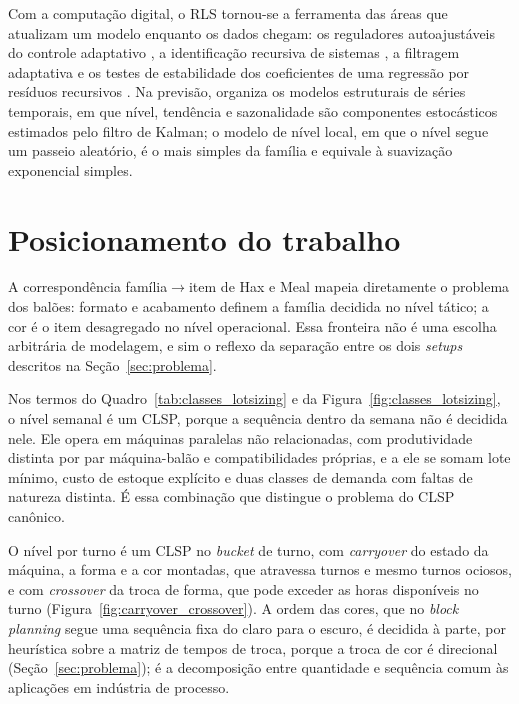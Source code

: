 \documentclass[
    12pt,
    openright,
    oneside,
    a4paper,
    fleqn,
    chapter=TITLE,
    section=TITLE,
    english,
    brazil
]{abntex2}
\begin{document}
Com a computação digital, o RLS tornou-se a ferramenta das áreas que atualizam um modelo enquanto os dados chegam: os reguladores autoajustáveis do controle adaptativo \cite{astromwittenmark1973}, a identificação recursiva de sistemas \cite{ljungsoderstrom1983}, a filtragem adaptativa \cite{haykin2014} e os testes de estabilidade dos coeficientes de uma regressão por resíduos recursivos \cite{brown1975}. Na previsão,  organiza os modelos estruturais de séries temporais, em que nível, tendência e sazonalidade são componentes estocásticos estimados pelo filtro de Kalman; o modelo de nível local, em que o nível segue um passeio aleatório, é o mais simples da família e equivale à suavização exponencial simples.

\section{Posicionamento do trabalho}
\label{sec:posicionamento}

A correspondência família$\to$item de Hax e Meal mapeia diretamente o problema dos balões: formato e acabamento definem a família decidida no nível tático; a cor é o item desagregado no nível operacional. Essa fronteira não é uma escolha arbitrária de modelagem, e sim o reflexo da separação entre os dois \textit{setups} descritos na Seção~\ref{sec:problema}.

Nos termos do Quadro~\ref{tab:classes_lotsizing} e da Figura~\ref{fig:classes_lotsizing}, o nível semanal é um CLSP, porque a sequência dentro da semana não é decidida nele. Ele opera em máquinas paralelas não relacionadas, com produtividade distinta por par máquina-balão e compatibilidades próprias, e a ele se somam lote mínimo, custo de estoque explícito e duas classes de demanda com faltas de natureza distinta. É essa combinação que distingue o problema do CLSP canônico.

O nível por turno é um CLSP no \textit{bucket} de turno, com \textit{carryover} do estado da máquina, a forma e a cor montadas, que atravessa turnos e mesmo turnos ociosos, e com \textit{crossover} da troca de forma, que pode exceder as horas disponíveis no turno (Figura~\ref{fig:carryover_crossover}). A ordem das cores, que no \textit{block planning} segue uma sequência fixa do claro para o escuro, é decidida à parte, por heurística sobre a matriz de tempos de troca, porque a troca de cor é direcional (Seção~\ref{sec:problema}); é a decomposição entre quantidade e sequência comum às aplicações em indústria de processo.
\end{document}

